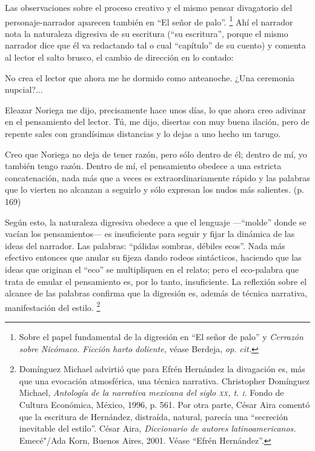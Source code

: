 \documentclass[14pt,twoside,final]{extbook} %
\let\oldfootnote\footnote
\renewcommand\footnote[1]{%
\oldfootnote{\hspace{1mm}#1}}
\begin{document}
Las observaciones sobre el proceso creativo y el mismo pensar divagatorio del personaje-narrador aparecen también en ``El señor de palo''.\footnote{Sobre el papel fundamental de la digresión en ``El señor de palo'' y \emph{Cerrazón sobre Nicómaco. Ficción harto doliente,} véase Berdeja, \emph{op. cit.}} Ahí el narrador nota la naturaleza digresiva de su escritura (``su escritura'', porque el mismo narrador dice que él va redactando tal o cual ``capítulo'' de su cuento) y comenta al lector el salto brusco, el cambio de dirección en lo contado:
\begin{quoting}
No crea el lector que ahora me he dormido como anteanoche. ¿Una ceremonia nupcial?...

Eleazar Noriega me dijo, precisamente hace unos días, lo que ahora creo adivinar en el pensamiento del lector. Tú, me dijo, disertas con muy buena ilación, pero de repente sales con grandísimas distancias y lo dejas a uno hecho un tarugo.

Creo que Noriega no deja de tener razón, pero sólo dentro de él; dentro de mí, yo también tengo razón. Dentro de mí, el pensamiento obedece a una estricta concatenación, nada más que a veces es extraordinariamente rápido y las palabras que lo vierten no alcanzan a seguirlo y sólo expresan los nudos más salientes. (p. 169)
\end{quoting}
Según esto, la naturaleza digresiva obedece a que el lenguaje ---``molde'' donde se vacían los pensamientos--- es insuficiente para seguir y fijar la dinámica de las ideas del narrador. Las palabras: ``pálidas sombras, débiles ecos''. Nada más efectivo entonces que anular su fijeza dando
rodeos sintácticos, haciendo que las ideas que originan el ``eco'' se multipliquen en el relato; pero el eco-palabra que trata de emular el pensamiento es, por lo tanto, insuficiente. La reflexión sobre el alcance de las palabras confirma que la digresión es, además de técnica narrativa, manifestación del estilo.\footnote{Domínguez Michael advirtió que para Efrén Hernández la divagación es, más que una evocación atmosférica, una técnica narrativa. Christopher Domínguez Michael, \emph{Antología de la narrativa mexicana del siglo \textsc{xx}, t. \textsc{i}.} Fondo de Cultura Económica, México, 1996, p. 561. Por otra parte, César Aira comentó que la escritura de Hernández, distraída, natural, parecía una ``secreción inevitable del estilo''. César Aira, \emph{Diccionario de autores latinoamericanos.} Emecé"/Ada Korn, Buenos Aires, 2001. Véase ``Efrén Hernández''.}
\end{document}
